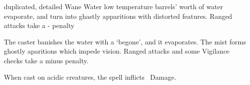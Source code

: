 
  {duplicated, detailed}%
  {Wane}%
  {Water}%
  {low temperature}%
  { barrels' worth of water evaporate, and turn into ghastly apparitions with distorted features.  Ranged attacks take a - penalty}%
  {
    The caster banishes the water with a `begone', and it evaporates.
    The mist forms ghostly aparitions which impede vision.
    Ranged attacks and some Vigilance checks take a minus  penalty.

  When cast on acidic creatures, the spell inflicts \showDam\ Damage.}
